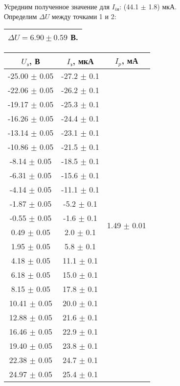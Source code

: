 \documentclass[a4paper,12pt]{article}
\begin{document}
Усредним полученное значение для $I_{i\text{н}}$: (44.1 $\pm$ 1.8) мкА. \\

Определим $\Delta U$ между точками 1 и 2: \begin{tabular}{|c|} \hline $\Delta U = 6.90 \pm 0.59 $ В.\\ \hline \end{tabular}

\begin{tabular}{|c|c|c|}
	\hline
	$U_{\text{з}}$, В & $I_{\text{з}}$, мкА &  $I_p$, мА \\
	\hline
	-25.00 $\pm$ 0.05 & -27.2 $\pm$ 0.1 & \multirow{22}{*}{1.49 $\pm$ 0.01}\\
	\cline{1-2} 
	-22.06 $\pm$ 0.05 & -26.2 $\pm$ 0.1 & \\
	\cline{1-2}
	-19.17 $\pm$ 0.05 & -25.3 $\pm$ 0.1 & \\
	\cline{1-2}
	-16.26 $\pm$ 0.05 & -24.4 $\pm$ 0.1 & \\
	\cline{1-2}
	-13.14 $\pm$ 0.05 & -23.1 $\pm$ 0.1 & \\
	\cline{1-2}
	-10.86 $\pm$ 0.05 & -21.5 $\pm$ 0.1 & \\
	\cline{1-2}
	-8.14 $\pm$ 0.05 & -18.5 $\pm$ 0.1 & \\
	\cline{1-2}
	-6.31 $\pm$ 0.05 & -15.6 $\pm$ 0.1 & \\
	\cline{1-2}
	-4.14 $\pm$ 0.05 & -11.1 $\pm$ 0.1 & \\
	\cline{1-2}
	-1.87 $\pm$ 0.05 & -5.2 $\pm$ 0.1 & \\
	\cline{1-2}
	-0.55 $\pm$ 0.05 & -1.6 $\pm$ 0.1 & \\
	\cline{1-2}
	0.49 $\pm$ 0.05 & 2.0 $\pm$ 0.1 & \\
	\cline{1-2}
	1.95 $\pm$ 0.05 & 5.8 $\pm$ 0.1 & \\
	\cline{1-2}
	4.18 $\pm$ 0.05 & 11.1 $\pm$ 0.1 & \\
	\cline{1-2}
	6.18 $\pm$ 0.05 & 15.0 $\pm$ 0.1 & \\
	\cline{1-2}
	8.15 $\pm$ 0.05 & 17.8 $\pm$ 0.1 & \\
	\cline{1-2}
	10.41 $\pm$ 0.05 & 20.0 $\pm$ 0.1 & \\
	\cline{1-2}
	12.88 $\pm$ 0.05 & 21.6 $\pm$ 0.1 & \\
	\cline{1-2}
	16.46 $\pm$ 0.05 & 22.9 $\pm$ 0.1 & \\
	\cline{1-2}
	19.40 $\pm$ 0.05 & 23.8 $\pm$ 0.1 & \\
	\cline{1-2}
	22.38 $\pm$ 0.05 & 24.7 $\pm$ 0.1 & \\
	\cline{1-2}
	24.97 $\pm$ 0.05 & 25.4 $\pm$ 0.1 & \\
	\hline
\end{tabular}
\end{document}
